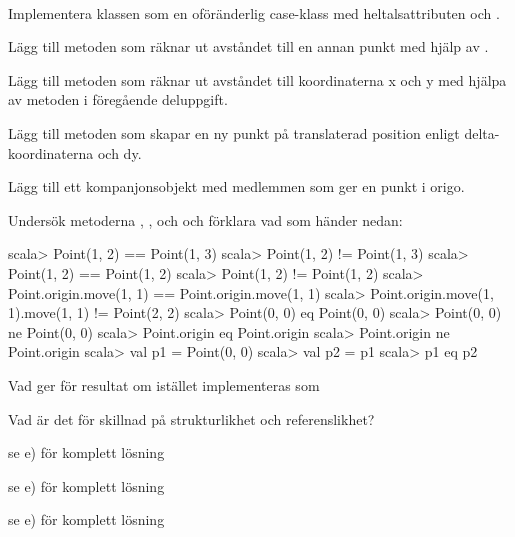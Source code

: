 




\QUESTBEGIN

\Task \label{task:Point} \what~

\Subtask Implementera klassen  som en oföränderlig case-klass med heltalsattributen  och .

\Subtask Lägg till metoden  som räknar ut avståndet till en annan punkt med hjälp av .

\Subtask Lägg till metoden  som räknar ut avståndet till koordinaterna x och y med hjälpa av metoden i föregående deluppgift.

\Subtask Lägg till metoden  som skapar en ny punkt på translaterad position enligt delta-koordinaterna  och {dy}.

\Subtask Lägg till ett kompanjonsobjekt med medlemmen  som ger en punkt i origo.

\Subtask Undersök metoderna \code{==}, \code{!=},  och  och förklara vad som händer nedan:
\begin{REPL}
scala> Point(1, 2) == Point(1, 3)
scala> Point(1, 2) != Point(1, 3)
scala> Point(1, 2) == Point(1, 2)
scala> Point(1, 2) != Point(1, 2)
scala> Point.origin.move(1, 1) == Point.origin.move(1, 1)
scala> Point.origin.move(1, 1).move(1, 1) != Point(2, 2)
scala> Point(0, 0) eq Point(0, 0)
scala> Point(0, 0) ne Point(0, 0)
scala> Point.origin eq Point.origin
scala> Point.origin ne Point.origin
scala> val p1 = Point(0, 0)
scala> val p2 = p1
scala> p1 eq p2
\end{REPL}

\Subtask Vad ger  för resultat om  istället  implementeras som 

\Subtask\Pen Vad är det för skillnad på strukturlikhet och referenslikhet?

\SOLUTION


\TaskSolved \what


\SubtaskSolved  se e) för komplett lösning

\SubtaskSolved  se e) för komplett lösning

\SubtaskSolved  se e) för komplett lösning

